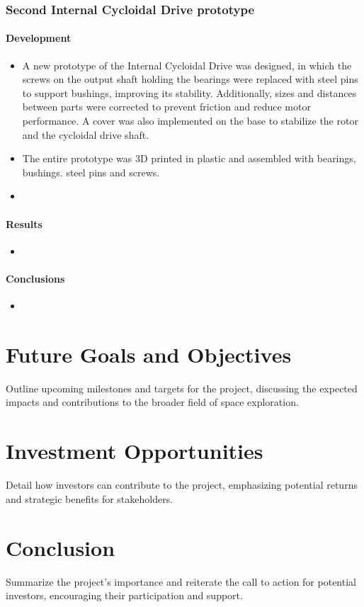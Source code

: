 \documentclass{article}
\begin{document}
\subsubsection{Second \textbf{Internal} Cycloidal Drive prototype}
\paragraph[short]{Development}
\begin{itemize}
    \item A new prototype of the Internal Cycloidal Drive was designed, in which the screws on the output shaft holding the bearings were replaced with steel pins to support bushings, improving its stability. Additionally, sizes and distances between parts were corrected to prevent friction and reduce motor performance. A cover was also implemented on the base to stabilize the rotor and the cycloidal drive shaft.
    \item The entire prototype was 3D printed in plastic and assembled with bearings, bushings. steel pins and screws.
    \item 
\end{itemize}
\paragraph[short]{Results}
\begin{itemize}
    \item
\end{itemize}

\paragraph[short]{Conclusions}
\begin{itemize}
    \item
\end{itemize}

\section{Future Goals and Objectives}
Outline upcoming milestones and targets for the project, discussing the expected impacts and contributions to the broader field of space exploration.

\section{Investment Opportunities}
Detail how investors can contribute to the project, emphasizing potential returns and strategic benefits for stakeholders.

\section*{Conclusion}
Summarize the project's importance and reiterate the call to action for potential investors, encouraging their participation and support.
\end{document}
